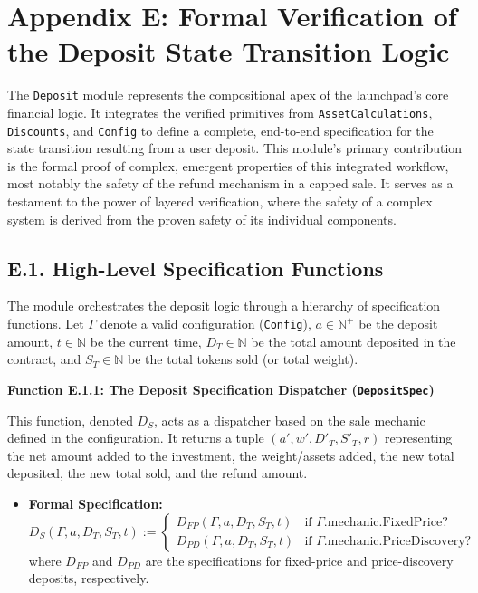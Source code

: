 \documentclass[
  english,
  onecolumn]{article}
\providecommand{\tightlist}{%
  \setlength{\itemsep}{0pt}\setlength{\parskip}{0pt}}
\begin{document}
\section{Appendix E: Formal Verification of the Deposit State Transition
Logic}\label{appendix-e-formal-verification-of-the-deposit-state-transition-logic}

The \texttt{Deposit} module represents the compositional apex of the
launchpad's core financial logic. It integrates the verified primitives
from \texttt{AssetCalculations}, \texttt{Discounts}, and \texttt{Config}
to define a complete, end-to-end specification for the state transition
resulting from a user deposit. This module's primary contribution is the
formal proof of complex, emergent properties of this integrated
workflow, most notably the safety of the refund mechanism in a capped
sale. It serves as a testament to the power of layered verification,
where the safety of a complex system is derived from the proven safety
of its individual components.

\subsection{E.1. High-Level Specification
Functions}\label{e.1.-high-level-specification-functions}

The module orchestrates the deposit logic through a hierarchy of
specification functions. Let \(\Gamma\) denote a valid configuration
(\texttt{Config}), \(a \in \mathbb{N}^+\) be the deposit amount,
\(t \in \mathbb{N}\) be the current time, \(D_T \in \mathbb{N}\) be the
total amount deposited in the contract, and \(S_T \in \mathbb{N}\) be
the total tokens sold (or total weight).

\textbf{Function E.1.1: The Deposit Specification Dispatcher
(\texttt{DepositSpec})}

This function, denoted \(D_S\), acts as a dispatcher based on the sale
mechanic defined in the configuration. It returns a tuple
\((a', w', D'_T, S'_T, r)\) representing the net amount added to the
investment, the weight/assets added, the new total deposited, the new
total sold, and the refund amount.

\begin{itemize}
\tightlist
\item
  \textbf{Formal Specification:} \[
  D_S(\Gamma, a, D_T, S_T, t) := \begin{cases}
  D_{FP}(\Gamma, a, D_T, S_T, t) & \text{if } \Gamma.\text{mechanic.FixedPrice?} \\
  D_{PD}(\Gamma, a, D_T, S_T, t) & \text{if } \Gamma.\text{mechanic.PriceDiscovery?}
  \end{cases}
  \] where \(D_{FP}\) and \(D_{PD}\) are the specifications for
  fixed-price and price-discovery deposits, respectively.
\end{itemize}
\end{document}
